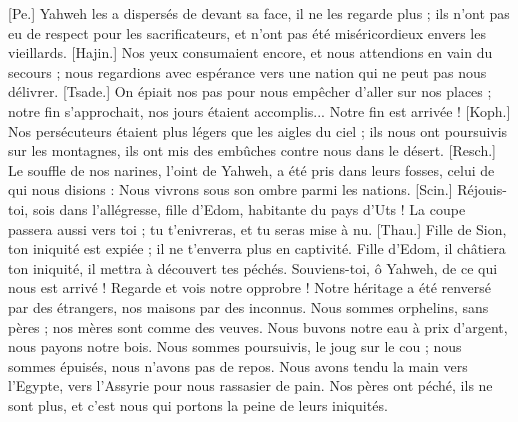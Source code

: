 \begin{multicols}{2}
[Pe.] Yahweh les a dispersés de devant sa face, il ne les regarde plus ; ils n’ont pas eu de respect pour les sacrificateurs, et n'ont pas été miséricordieux envers les vieillards.
[Hajin.] Nos yeux consumaient encore, et nous attendions en vain du secours ; nous regardions avec espérance vers une nation qui ne peut pas nous délivrer.
[Tsade.] On épiait nos pas pour nous empêcher d'aller sur nos places ; notre fin s'approchait, nos jours étaient accomplis... Notre fin est arrivée !
[Koph.] Nos persécuteurs étaient plus légers que les aigles du ciel ; ils nous ont poursuivis sur les montagnes, ils ont mis des embûches contre nous dans le désert.
[Resch.] Le souffle de nos narines, l’oint de Yahweh, a été pris dans leurs fosses, celui de qui nous disions : Nous vivrons sous son ombre parmi les nations.
[Scin.] Réjouis-toi, sois dans l’allégresse, fille d’Edom, habitante du pays d'Uts ! La coupe passera aussi vers toi ; tu t'enivreras, et tu seras mise à nu.
[Thau.] Fille de Sion, ton iniquité est expiée ; il ne t'enverra plus en captivité. Fille d’Edom, il châtiera ton iniquité, il mettra à découvert tes péchés.
\VerseOne{}Souviens-toi, ô Yahweh, de ce qui nous est arrivé ! Regarde et vois notre opprobre !
Notre héritage a été renversé par des étrangers, nos maisons par des inconnus.
Nous sommes orphelins, sans pères ; nos mères sont comme des veuves.
Nous buvons notre eau à prix d’argent, nous payons notre bois.
Nous sommes poursuivis, le joug sur le cou ; nous sommes épuisés, nous n’avons pas de repos.
Nous avons tendu la main vers l'Egypte, vers l'Assyrie pour nous rassasier de pain.
Nos pères ont péché, ils ne sont plus, et c’est nous qui portons la peine de leurs iniquités.

\end{multicols}
